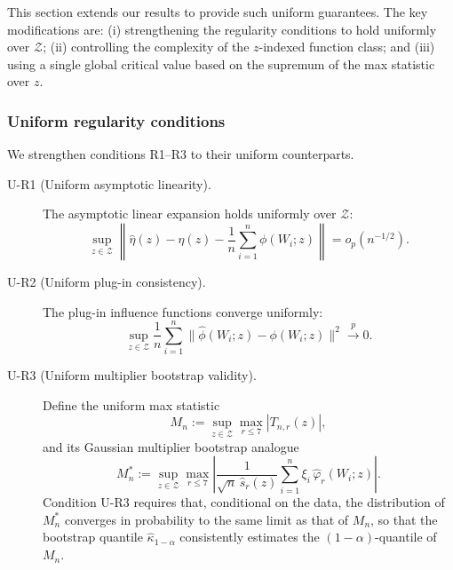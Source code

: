 \documentclass[accepted]{uai2026} %
\theoremstyle{plain}
\theoremstyle{definition}
\theoremstyle{remark}
\begin{document}
This section extends our results to provide such uniform guarantees. The key
modifications are: (i) strengthening the regularity conditions to hold
uniformly over $\mathcal{Z}$; (ii) controlling the complexity of the
$z$-indexed function class; and (iii) using a single global critical value
based on the supremum of the max statistic over $z$.

\subsubsection{Uniform regularity conditions}
\label{subsubsec:uniform-regularity}

We strengthen conditions R1--R3 to their uniform counterparts.

\begin{description}
  \item[U-R1 (Uniform asymptotic linearity).]
  The asymptotic linear expansion holds uniformly over $\mathcal{Z}$:
  \begin{equation}
    \label{eq:UR1}
    \sup_{z \in \mathcal{Z}} \left\|
      \hat\eta(z) - \eta(z) - \frac{1}{n}\sum_{i=1}^n \phi(W_i;z)
    \right\| = o_p(n^{-1/2}).
  \end{equation}

  \item[U-R2 (Uniform plug-in consistency).]
  The plug-in influence functions converge uniformly:
  \begin{equation}
    \label{eq:UR2}
    \sup_{z \in \mathcal{Z}} \frac{1}{n}\sum_{i=1}^n
      \bigl\|\hat\phi(W_i;z) - \phi(W_i;z)\bigr\|^2
    \xrightarrow{p} 0.
  \end{equation}

  \item[U-R3 (Uniform multiplier bootstrap validity).]
  Define the uniform max statistic
  \begin{equation}
    \label{eq:uniform-max}
    M_n := \sup_{z \in \mathcal{Z}} \max_{r \le 7} |T_{n,r}(z)|,
  \end{equation}
  and its Gaussian multiplier bootstrap analogue
  \begin{equation}
    \label{eq:uniform-bootstrap}
    M_n^* := \sup_{z \in \mathcal{Z}} \max_{r \le 7}
      \left| \frac{1}{\sqrt{n}\,\hat s_r(z)}
        \sum_{i=1}^n \xi_i\,\hat\varphi_r(W_i;z) \right|.
  \end{equation}
  Condition U-R3 requires that, conditional on the data, the distribution of
  $M_n^*$ converges in probability to the same limit as that of $M_n$, so
  that the bootstrap quantile $\hat\kappa_{1-\alpha}$ consistently estimates
  the $(1-\alpha)$-quantile of $M_n$.
\end{description}
\end{document}
